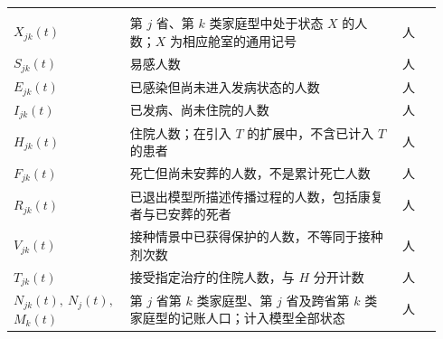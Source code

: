 \begin{longtable}{@{}>{\raggedright\arraybackslash}p{0.23\linewidth}>{\raggedright\arraybackslash}p{0.62\linewidth}>{\raggedright\arraybackslash}p{0.09\linewidth}@{}}
\midrule
\multicolumn{3}{@{}l}{\textbf{状态变量与人口规模}}\\*
$X_{jk}(t)$ & 第 $j$ 省、第 $k$ 类家庭型中处于状态 $X$ 的人数；$X$ 为相应舱室的通用记号 & 人 \\
$S_{jk}(t)$ & 易感人数 & 人 \\
$E_{jk}(t)$ & 已感染但尚未进入发病状态的人数 & 人 \\
$I_{jk}(t)$ & 已发病、尚未住院的人数 & 人 \\
$H_{jk}(t)$ & 住院人数；在引入 $T$ 的扩展中，不含已计入 $T$ 的患者 & 人 \\
$F_{jk}(t)$ & 死亡但尚未安葬的人数，不是累计死亡人数 & 人 \\
$R_{jk}(t)$ & 已退出模型所描述传播过程的人数，包括康复者与已安葬的死者 & 人 \\
$V_{jk}(t)$ & 接种情景中已获得保护的人数，不等同于接种剂次数 & 人 \\
$T_{jk}(t)$ & 接受指定治疗的住院人数，与 $H$ 分开计数 & 人 \\
$N_{jk}(t),\ N_j(t),$\newline $M_k(t)$ & 第 $j$ 省第 $k$ 类家庭型、第 $j$ 省及跨省第 $k$ 类家庭型的记账人口；计入模型全部状态 & 人 \\


\end{longtable}
